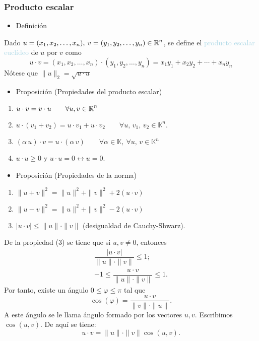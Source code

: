\subsubsection{Producto escalar}
\begin{itemize}[label=\color{red}\textbullet, leftmargin=*]
	\item \color{lightblue}Definición
\end{itemize}
Dado $u=(x_1,x_2,\dots,x_n),\: v=(y_1,y_2,\dots,y_n)\in\operatorname{\mathbb{R}}^n$, se define el \textcolor{lightblue}{producto escalar euclídeo} de $u$ por $v$ como \[ u\cdot v=(x_1,x_2,\dots,x_n)\cdot(y_1,y_2,\dots,y_n)=x_1y_1+x_2y_2+\cdots+x_ny_n \] Nótese que $\|u\|_2=\sqrt{u\cdot u}$
\begin{itemize}[label=\color{red}\textbullet, leftmargin=*]
	\item \color{lightblue}Proposición (Propiedades del producto escalar)
\end{itemize}
\begin{enumerate}[label=\color{lightblue}\arabic*)]
	\item $u\cdot v=v\cdot u\qquad\forall u,v\in\operatorname{\mathbb{R}}^n$
	\item $u\cdot(v_1+v_2)=u\cdot v_1+u\cdot v_2\qquad \forall u,\, v_1,\, v_2\in\mathbb{K}^n$.
	\item $(\alpha\, u)\cdot v=u\cdot(\alpha\, v)\qquad\forall\alpha\in\mathbb{K},\:\forall u,\, v\in\mathbb{K}^n$
	\item $u\cdot u\ge0$ y $u\cdot u=0\longleftrightarrow u=0$.
\end{enumerate}
\begin{itemize}[label=\color{red}\textbullet, leftmargin=*]
	\item \color{lightblue}Proposición (Propiedades de la norma)
\end{itemize}
\begin{enumerate}[label=\color{lightblue}\arabic*)]
	\item $\|u+v\|^2=\|u\|^2+\|v\|^2+2(u\cdot v)$
	\item $\|u-v\|^2=\|u\|^2+\|v\|^2-2(u\cdot v)$
	\item $|u\cdot v|\le\|u\|\cdot\|v\|$ (desigualdad de Cauchy-Shwarz).
\end{enumerate}
De la propiedad (3) se tiene que si $u,v\neq0$, entonces \[ \begin{array}{c}
	\dfrac{|u\cdot v|}{\|u\|\cdot\|v\|}\le1; \\
	-1\le\dfrac{u\cdot v}{\|u\|\cdot\|v\|}\le1.
\end{array}\]
Por tanto, existe un ángulo $0\le\varphi\le\pi$ tal que \[ \cos(\varphi)=\dfrac{u\cdot v}{\|v\|\cdot\|u\|}. \]
A este ángulo se le llama ángulo formado por los vectores $u,v$. Escribimos $\cos(u,v)$. De aquí se tiene: \[ u\cdot v=\|u\|\cdot\|v\|\cos(u,v). \]

